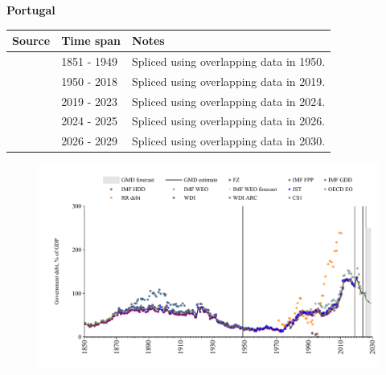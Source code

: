 \documentclass[12pt,a4paper,landscape]{article}
\begin{document}
\begin{adjustbox}{max totalsize={\paperwidth}{\paperheight},center}
\begin{minipage}[t][\textheight][t]{\textwidth}
\vspace*{0.5cm}
{}
\begin{center}
{\Large\bfseries Portugal}
\end{center}
\vspace{0.5cm}
\begin{table}[H]
\centering
\small
\begin{tabular}{|l|l|l|}
\hline
\textbf{Source} & \textbf{Time span} & \textbf{Notes} \\
\hline
\rowcolor{white}\cite{IMF_FPP}& 1851 - 1949 &Spliced using overlapping data in 1950.\\
\rowcolor{lightgray}\cite{IMF_GDD}& 1950 - 2018 &Spliced using overlapping data in 2019.\\
\rowcolor{white}\cite{IMF_FPP}& 2019 - 2023 &Spliced using overlapping data in 2024.\\
\rowcolor{lightgray}\cite{OECD_EO}& 2024 - 2025 &Spliced using overlapping data in 2026.\\
\rowcolor{white}\cite{IMF_WEO_forecast}& 2026 - 2029 &Spliced using overlapping data in 2030.\\
\hline
\end{tabular}
\end{table}
\begin{figure}[H]
\centering
\includegraphics[width=\textwidth,height=0.6\textheight,keepaspectratio]{graphs/PRT_govdebt_GDP.pdf}
\end{figure}
\end{minipage}
\end{adjustbox}
\end{document}

